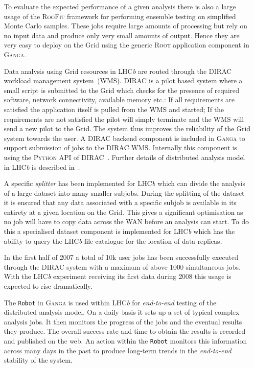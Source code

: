 \documentclass{elsart}
\def\lhcb {LHC{\em b\/}\xspace}
\def\dirac{DIRAC\xspace}
\def\ganga {\textsc{Ganga}\xspace}
\def\python {\textsc{Python}\xspace}
\def\root {\textsc{Root}\xspace}
\def\grid {Grid\xspace}
\def\roofit{\textsc{RooFit}\xspace}
\newcommand{\code}[1]{\texttt{#1}}
\begin{document}
To evaluate the expected performance of a given analysis there is also a large
usage of the \roofit framework for performing ensemble testing on simplified
Monte Carlo samples. These jobs require large amounts of processing but rely
on no input data and produce only very small amounts of output. Hence they are
very easy to deploy on the \grid using the generic \root application component
in \ganga.

Data analysis using \grid resources in \lhcb are routed through the
\dirac~\cite{DIRAC} workload management system~(WMS). \dirac is a pilot based
system where a small script is submitted to the \grid which checks for the
presence of required software, network connectivity, available memory etc.: If
all requirements are satisfied the application itself is pulled from the WMS
and started; If the requirements are not satisfied the pilot will simply
terminate and the WMS will send a new pilot to the \grid. The system thus
improves the reliability of the \grid system towards the user. A \dirac backend
component is included in \ganga to support submission of jobs to the \dirac
WMS. Internally this component is using the \python API of
\dirac~\cite{DIRACAPI}.  Further details of distributed analysis model in
\lhcb is described in~\cite{lhcb:2005jj}.

A specific \emph{splitter} has been implemented for \lhcb which can divide the
analysis of a large dataset into many smaller subjobs. During the splitting of
the dataset it is ensured that any data associated with a specific subjob is
available in its entirety at a given location on the \grid. This gives a
significant optimisation as no job will have to copy data across the WAN
before an analysis can start. To do this a specialised dataset component is
implemented for \lhcb which has the ability to query the \lhcb file catalogue
for the location of data replicas.

In the first half of 2007 a total of 10k user jobs has been successfully
executed through the \dirac system with a maximum of above 1000 simultaneous
jobs. With the \lhcb experiment receiving its first data during 2008 this
usage is expected to rise dramatically.

The \code{Robot} in \ganga is used within \lhcb for \emph{end-to-end} testing
of the distributed analysis model. On a daily basis it sets up a set of
typical complex analysis jobs. It then monitors the progress of the jobs and
the eventual results they produce. The overall success rate and time to obtain
the results is recorded and published on the web. An action within the
\code{Robot} monitors this information across many days in the past to produce
long-term trends in the \emph{end-to-end} stability of the system.
\end{document}
